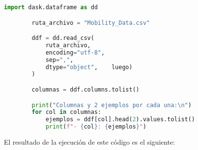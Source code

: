     \begin{lstlisting}[language=Python, breaklines=true]
        import dask.dataframe as dd

        ruta_archivo = "Mobility_Data.csv"  

        ddf = dd.read_csv(
            ruta_archivo,
            encoding="utf-8",  
            sep=",",          
            dtype="object",    luego)
        )

        columnas = ddf.columns.tolist()

        print("Columnas y 2 ejemplos por cada una:\n")
        for col in columnas:
            ejemplos = ddf[col].head(2).values.tolist() 
            print(f"- {col}: {ejemplos}")
    \end{lstlisting}

\noindent El resultado de la ejecución de este código es el siguiente:

